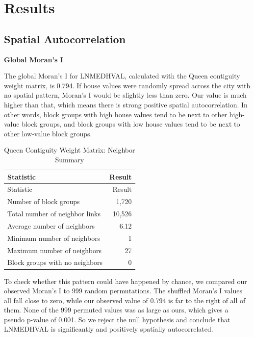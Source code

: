 \documentclass[
  12pt,
]{article}
\begin{document}
\section{Results}\label{results}

\subsection{Spatial Autocorrelation}\label{spatial-autocorrelation-1}

\textbf{Global Moran's I}

The global Moran's I for LNMEDHVAL, calculated with the Queen contiguity
weight matrix, is 0.794. If house values were randomly spread across the
city with no spatial pattern, Moran's I would be slightly less than
zero. Our value is much higher than that, which means there is strong
positive spatial autocorrelation. In other words, block groups with high
house values tend to be next to other high-value block groups, and block
groups with low house values tend to be next to other low-value block
groups.

\begin{longtable}[]{@{}lr@{}}
\caption{Queen Contiguity Weight Matrix: Neighbor
Summary}\tabularnewline
\toprule\noalign{}
Statistic & Result \\
\midrule\noalign{}
\endfirsthead
\toprule\noalign{}
Statistic & Result \\
\midrule\noalign{}
\endhead
\bottomrule\noalign{}
\endlastfoot
Number of block groups & 1,720 \\
Total number of neighbor links & 10,526 \\
Average number of neighbors & 6.12 \\
Minimum number of neighbors & 1 \\
Maximum number of neighbors & 27 \\
Block groups with no neighbors & 0 \\
\end{longtable}

To check whether this pattern could have happened by chance, we compared
our observed Moran's I to 999 random permutations. The shuffled Moran's
I values all fall close to zero, while our observed value of 0.794 is
far to the right of all of them. None of the 999 permuted values was as
large as ours, which gives a pseudo p-value of 0.001. So we reject the
null hypothesis and conclude that LNMEDHVAL is significantly and
positively spatially autocorrelated.
\end{document}

